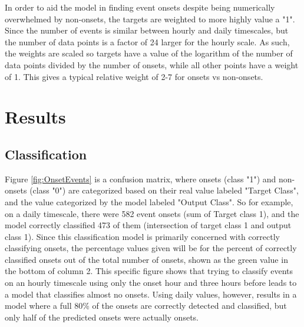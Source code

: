 In order to aid the model in finding event onsets despite being numerically overwhelmed by non-onsets, the targets are weighted to more highly value a "1". Since the number of events is similar between hourly and daily timescales, but the number of data points is a factor of 24 larger for the hourly scale. As such, the weights are scaled so targets have a value of the logarithm of the number of data points divided by the number of onsets, while all other points have a weight of 1. This gives a typical relative weight of 2-7 for onsets vs non-onsets. 


\section{Results}

\subsection{Classification} \label{sec:ClassifyResults}

Figure \ref{fig:OnsetEvents} is a confusion matrix, where onsets (class "1") and non-onsets (class "0") are categorized based on their real value labeled "Target Class", and the value categorized by the model labeled "Output Class". So for example, on a daily timescale, there were 582 event onsets (sum of Target class 1), and the model correctly classified 473 of them (intersection of target class 1 and output class 1). Since this classification model is primarily concerned with correctly classifying onsets, the percentage values given will be for the percent of correctly classified onsets out of the total number of onsets, shown as the green value in the bottom of column 2. This specific figure shows that trying to classify events on an hourly timescale using only the onset hour and three hours before leads to a model that classifies almost no onsets. Using daily values, however, results in a model where a full 80\% of the onsets are correctly detected and classified, but only half of the predicted onsets were actually onsets.


